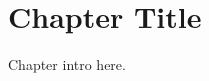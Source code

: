 \documentclass[../build/book.tex]{subfiles}
\begin{document}
\chapter{Chapter Title}

Chapter intro here.
\end{document}
